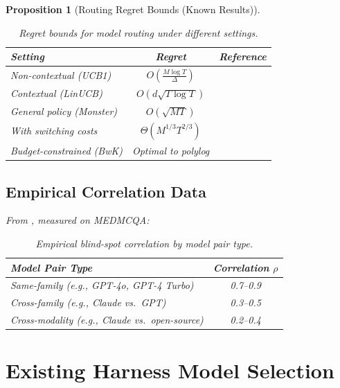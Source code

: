 \documentclass[11pt, a4paper, copyright]{googledeepmind}
\newtheorem{proposition}{Proposition}[section]
\begin{document}
\begin{proposition}[Routing Regret Bounds (Known Results)]
\begin{appendices}
\begin{table}[htbp]
\centering
\begin{tabular}{lcc}
\toprule
\textbf{Setting} & \textbf{Regret} & \textbf{Reference} \\
\midrule
Non-contextual (UCB1) & $O\left(\frac{M \log T}{\Delta}\right)$ & \citet{auer2002} \\
Contextual (LinUCB) & $O(d\sqrt{T \log T})$ & \citet{li2010linucb} \\
General policy (Monster) & $O(\sqrt{MT})$ & \citet{agarwal2014monster} \\
With switching costs & $\Theta(M^{1/3} T^{2/3})$ & \citet{dekel2014switching} \\
Budget-constrained (BwK) & Optimal to polylog & \citet{badanidiyuru2018bwk} \\
\bottomrule
\end{tabular}
\caption{Regret bounds for model routing under different settings.}
\end{table}

\subsection{Empirical Correlation Data}

From \citet{correlatedensemble2026}, measured on MEDMCQA:

\begin{table}[htbp]
\centering
\begin{tabular}{lc}
\toprule
\textbf{Model Pair Type} & \textbf{Correlation $\rho$} \\
\midrule
Same-family (e.g., GPT-4o, GPT-4 Turbo) & 0.7--0.9 \\
Cross-family (e.g., Claude vs.\ GPT) & 0.3--0.5 \\
Cross-modality (e.g., Claude vs.\ open-source) & 0.2--0.4 \\
\bottomrule
\end{tabular}
\caption{Empirical blind-spot correlation by model pair type.}
\end{table}

\section{Existing Harness Model Selection}
\label{app:harnesses}


\end{appendices}
\end{proposition}
\end{document}
